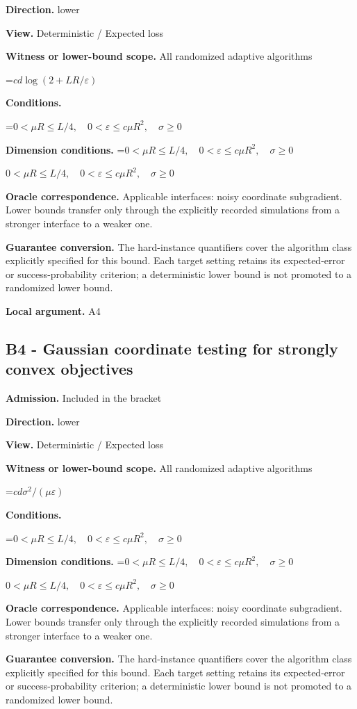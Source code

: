 \documentclass[10pt,a4paper]{article}
\newcommand{\AtlasMath}[1]{\par\begingroup\centering\setbox0=\hbox{$\displaystyle #1$}\ifdim\wd0>1.4\linewidth\typeout{ATLAS WIDE FORMULA: \the\wd0}\fi\ifdim\wd0>\linewidth\resizebox{\linewidth}{!}{\box0}\else\box0\fi\par\endgroup}
\newcommand{\AtlasInlineMath}[1]{\begingroup\setbox0=\hbox{$#1$}\ifdim\wd0>.4\linewidth\endgroup\AtlasMath{#1}\else\endgroup$#1$\fi}
\begin{document}
\textbf{Direction.} lower

\textbf{View.} Deterministic / Expected loss

\textbf{Witness or lower-bound scope.} All randomized adaptive algorithms

\AtlasMath{cd\log(2+LR/\varepsilon)}
\textbf{Conditions.} 
\AtlasMath{0<\mu R\le L/4,\quad0<\varepsilon\le c\mu R^2,\quad\sigma\ge0}


\textbf{Dimension conditions.} \AtlasInlineMath{0<\mu R\le L/4,\quad0<\varepsilon\le c\mu R^2,\quad\sigma\ge0}

\textbf{Oracle correspondence.} Applicable interfaces: noisy coordinate subgradient. Lower bounds transfer only through the explicitly recorded simulations from a stronger interface to a weaker one.

\textbf{Guarantee conversion.} The hard-instance quantifiers cover the algorithm class explicitly specified for this bound. Each target setting retains its expected-error or success-probability criterion; a deterministic lower bound is not promoted to a randomized lower bound.

\textbf{Local argument.} A4

\subsection{B4 - Gaussian coordinate testing for strongly convex objectives}
\textbf{Admission.} Included in the bracket

\textbf{Direction.} lower

\textbf{View.} Deterministic / Expected loss

\textbf{Witness or lower-bound scope.} All randomized adaptive algorithms

\AtlasMath{cd\sigma^2/(\mu\varepsilon)}
\textbf{Conditions.} 
\AtlasMath{0<\mu R\le L/4,\quad0<\varepsilon\le c\mu R^2,\quad\sigma\ge0}


\textbf{Dimension conditions.} \AtlasInlineMath{0<\mu R\le L/4,\quad0<\varepsilon\le c\mu R^2,\quad\sigma\ge0}

\textbf{Oracle correspondence.} Applicable interfaces: noisy coordinate subgradient. Lower bounds transfer only through the explicitly recorded simulations from a stronger interface to a weaker one.

\textbf{Guarantee conversion.} The hard-instance quantifiers cover the algorithm class explicitly specified for this bound. Each target setting retains its expected-error or success-probability criterion; a deterministic lower bound is not promoted to a randomized lower bound.
\end{document}
